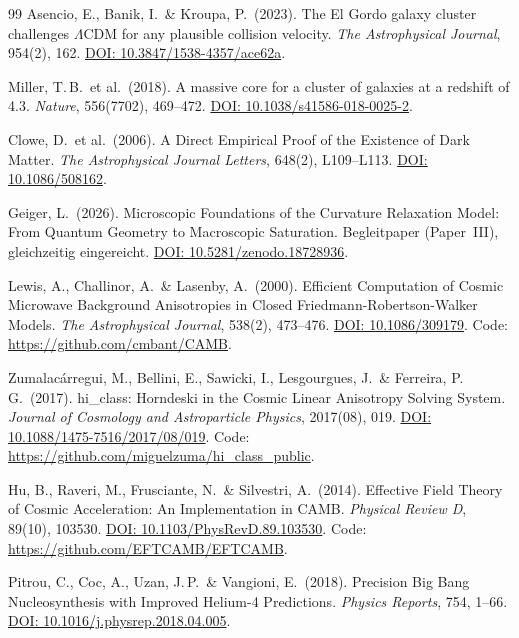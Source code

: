 \documentclass[aps,prd,twocolumn,superscriptaddress,nofootinbib]{revtex4-2}
\begin{document}
\begin{thebibliography}{99}
Asencio, E., Banik, I.\ \& Kroupa, P.\ (2023).
The El Gordo galaxy cluster challenges $\Lambda$CDM for any plausible collision velocity.
\textit{The Astrophysical Journal}, 954(2), 162.
\href{https://doi.org/10.3847/1538-4357/ace62a}{DOI: 10.3847/1538-4357/ace62a}.

Miller, T.\,B.\ et al.\ (2018).
A massive core for a cluster of galaxies at a redshift of 4.3.
\textit{Nature}, 556(7702), 469--472.
\href{https://doi.org/10.1038/s41586-018-0025-2}{DOI: 10.1038/s41586-018-0025-2}.

Clowe, D.\ et al.\ (2006).
A Direct Empirical Proof of the Existence of Dark Matter.
\textit{The Astrophysical Journal Letters}, 648(2), L109--L113.
\href{https://doi.org/10.1086/508162}{DOI: 10.1086/508162}.

Geiger, L.\ (2026).
Microscopic Foundations of the Curvature Relaxation Model: From Quantum Geometry to Macroscopic Saturation.
Begleitpaper (Paper~III), gleichzeitig eingereicht. \href{https://doi.org/10.5281/zenodo.18728936}{DOI: 10.5281/zenodo.18728936}.

Lewis, A., Challinor, A.\ \& Lasenby, A.\ (2000).
Efficient Computation of Cosmic Microwave Background Anisotropies in Closed Friedmann-Robertson-Walker Models.
\textit{The Astrophysical Journal}, 538(2), 473--476.
\href{https://doi.org/10.1086/309179}{DOI: 10.1086/309179}. Code: \url{https://github.com/cmbant/CAMB}.

Zumalac\'arregui, M., Bellini, E., Sawicki, I., Lesgourgues, J.\ \& Ferreira, P.\,G.\ (2017).
hi\_class: Horndeski in the Cosmic Linear Anisotropy Solving System.
\textit{Journal of Cosmology and Astroparticle Physics}, 2017(08), 019.
\href{https://doi.org/10.1088/1475-7516/2017/08/019}{DOI: 10.1088/1475-7516/2017/08/019}. Code: \url{https://github.com/miguelzuma/hi_class_public}.

Hu, B., Raveri, M., Frusciante, N.\ \& Silvestri, A.\ (2014).
Effective Field Theory of Cosmic Acceleration: An Implementation in CAMB.
\textit{Physical Review D}, 89(10), 103530.
\href{https://doi.org/10.1103/PhysRevD.89.103530}{DOI: 10.1103/PhysRevD.89.103530}. Code: \url{https://github.com/EFTCAMB/EFTCAMB}.

Pitrou, C., Coc, A., Uzan, J.\,P.\ \& Vangioni, E.\ (2018).
Precision Big Bang Nucleosynthesis with Improved Helium-4 Predictions.
\textit{Physics Reports}, 754, 1--66.
\href{https://doi.org/10.1016/j.physrep.2018.04.005}{DOI: 10.1016/j.physrep.2018.04.005}.


\end{thebibliography}
\end{document}
